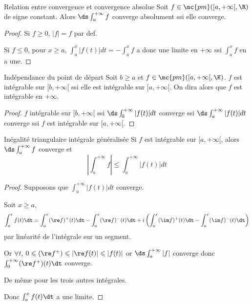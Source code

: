 \begin{proposition}{Relation entre convergence et convergence absolue}{}
    Soit $f \in \mc{pm}([a, + \infty[, \R)$ de signe constant. Alors 
    $\ds \int_a^{+ \infty} f$ converge absolument ssi elle converge. 
\end{proposition}

\begin{proof}
    Si $f \geqslant 0$, $|f| = f$ par def. 

    Si $f \leqslant 0$, pour $x \geqslant a$, $\int_a^x |f(t)| dt = - \int_a^x f$ a donc une 
    limite en $+ \infty$ ssi $\int_a^x f$ en a une.
\end{proof}

\begin{proposition}{Indépendance du point de départ}{}
    Soit $b \geqslant a$ et $f \in \mc{pm}([a, + \infty[, \K)$. 
    $f$ est intégrable sur $[b, + \infty[$ ssi elle est intégrable sur $[a, + \infty[$.
    On dira alors que $f$ est intégrable en $+ \infty$.
\end{proposition}

\begin{proof}
    $f$ intégrable sur $[b, + \infty[$ ssi $\ds \int_b^{+ \infty} |f(t)| dt$ converge
    ssi $\ds \int_a^{+ \infty} |f(t)| dt $ converge ssi $f$ est intégrable sur $[a, + \infty[$.
\end{proof}

\begin{theoreme}{Inégalité triangulaire intégrale généralisée}{}
    Si $f$ est intégrable sur $[a, + \infty[$, alors $\ds \int_a^{+ \infty} f$ converge et 
    $$\left| \int_{a }^{+\infty} f \right| \leqslant \int_{a }^{+\infty} |f(t)| dt $$
\end{theoreme}


\begin{proof}
    Supposons que $\int_a^{+ \infty} |f(t)| dt$ converge.

    Soit $x \geqslant a$,
    $$\int_a^x f(t) \dt = \int_a^x (\re f)^+(t) \dt - \int_a^x (\re f)^-(t) \dt + i \left( \int_a^x (\im f)^+(t) \dt - \int_a^x (\im f)^-(t) \dt \right)$$
    par linéarité de l'intégrale sur un segment.

    Or $\forall t$, $0 \leqslant (\re f^+) \leqslant \left| \re f(t) \right| \leqslant |f(t)|$ or 
    $\ds \int_{a }^{+ \infty   } |f| $ converge donc $\int_0^{+ \infty} (\re f^+)(t) \dt$ converge. 

    De même pour les trois autres intégrales.

    Donc $\int_a^x f(t) \dt$ a une limite. 
\end{proof}

